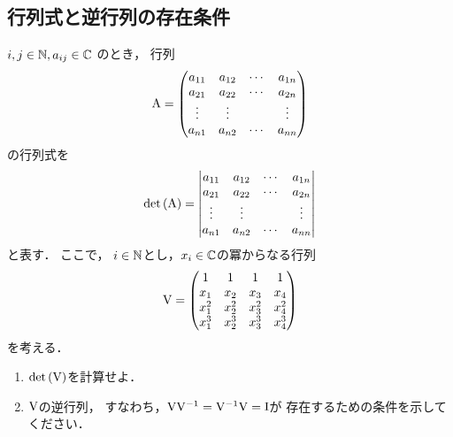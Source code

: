 \subsection{行列式と逆行列の存在条件}
    $i, j \in \mathbb{N}, a_{ij} \in \mathbb{C}$ のとき，
    行列
    \begin{equation}
      \mathrm{A}=
        \begin{pmatrix}
          a_{11} & a_{12} & \cdots & a_{1n} \\
          a_{21} & a_{22} & \cdots & a_{2n} \\
          \vdots & \vdots & & \vdots \\
          a_{n1} & a_{n2} & \cdots & a_{nn}
        \end{pmatrix}
    \end{equation}
    の行列式を
    \begin{equation}
      \det{(\mathrm{A})} =
        \begin{vmatrix}
          a_{11} & a_{12} & \cdots & a_{1n} \\
          a_{21} & a_{22} & \cdots & a_{2n} \\
          \vdots & \vdots & & \vdots \\
          a_{n1} & a_{n2} & \cdots & a_{nn}
        \end{vmatrix}
    \end{equation}
    と表す．
    ここで，
    $i \in \mathbb{N}$とし，$x_i \in \mathbb{C}$の冪からなる行列
    \begin{equation}
      \mathrm{V} =
        \begin{pmatrix}
          1 & 1 & 1 & 1 \\
          x_1 & x_2 & x_3 & x_4 \\
          x_1^2 & x_2^2 & x_3^2 & x_4^2 \\
          x_1^3 & x_2^3 & x_3^3 & x_4^3
        \end{pmatrix}
    \end{equation}
    を考える．
    \begin{enumerate}[label=(\roman*)]
      \item $\det{(\mathrm{V})}$を計算せよ．
      \item $\mathrm{V}$の逆行列，
        すなわち，$\mathrm{V}\mathrm{V}^{-1}=\mathrm{V}^{-1}\mathrm{V}=\mathrm{I}$が
        存在するための条件を示してください．
    \end{enumerate}


